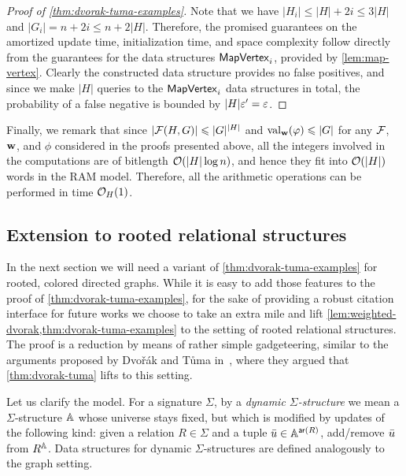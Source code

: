 \begin{proof} [Proof of \cref{thm:dvorak-tuma-examples}]
	Note that we have $|H_i|\leq |H|+2i\leq 3|H|$ and $|G_i| = n+2i\leq n + 2|H|$. Therefore, the promised guarantees on the amortized update time, initialization time, and space complexity follow directly from the guarantees for the data structures $\mathsf{MapVertex}_i$, provided by \cref{lem:map-vertex}. Clearly the constructed data structure provides no false positives, and since we make $|H|$ queries to the $\mathsf{MapVertex}_i$ data structures in total, the probability of a false negative is bounded by $|H|\varepsilon'=\varepsilon$.
\end{proof}

Finally, we remark that since $|\mathcal{F}(H, G)| \leqslant |G|^{|H|}$ and $\mathrm{val}_{\mathbf{w}}(\varphi) \leqslant |G|$ for any $\mathcal{F}$, $\mathbf{w}$, and $\phi$ considered in the proofs presented above, all the integers involved in the computations are of bitlength $\mathcal{O}(|H|\log n)$, and hence they fit into $\mathcal{O}(|H|)$ words in the RAM model. Therefore, all the arithmetic operations can be performed in time $\mathcal{O}_H(1)$.

\subsection{Extension to rooted relational structures}

In the next section we will need a variant of \cref{thm:dvorak-tuma-examples} for rooted, colored directed graphs. While it is easy to add those features to the proof of \cref{thm:dvorak-tuma-examples}, for the sake of providing a robust citation interface for future works we choose to take an extra mile and lift \cref{lem:weighted-dvorak,thm:dvorak-tuma-examples} to the setting of rooted relational structures. The proof is a reduction by means of rather simple gadgeteering, similar to the arguments proposed by Dvo\v{r}\'ak and T\r{u}ma in~\cite[Section~4]{DvorakTumaArxiv}, where they argued that \cref{thm:dvorak-tuma} lifts to this setting.

Let us clarify the model. For a signature $\Sigma$, by a \emph{dynamic $\Sigma$-structure} we mean a $\Sigma$-structure $\mathbb{A}$ whose universe stays fixed, but which is modified by updates of the following kind: given a relation $R\in \Sigma$ and a tuple ${\bar{u}}\in \mathbb{A}^{\mathsf{ar}(R)}$, add/remove ${\bar{u}}$ from $R^{\mathbb{A}}$. Data structures for dynamic $\Sigma$-structures are defined analogously to the graph setting.



